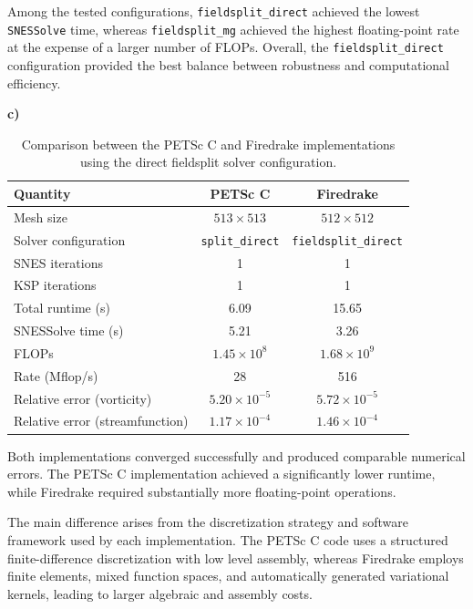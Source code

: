 \documentclass[12pt]{article}
\begin{document}
Among the tested configurations, \texttt{fieldsplit\_direct} achieved the lowest \texttt{SNESSolve} time, whereas \texttt{fieldsplit\_mg} achieved the highest floating-point rate at the expense of a larger number of FLOPs. 
Overall, the \texttt{fieldsplit\_direct} configuration provided the best balance between robustness and computational efficiency.


\textbf{c)}

\begin{table}[h!]
\centering
\small
\begin{tabular}{lcc}
\hline
\textbf{Quantity} & \textbf{PETSc C} & \textbf{Firedrake} \\
\hline
Mesh size & $513 \times 513$ & $512 \times 512$ \\

Solver configuration & \texttt{split\_direct} & \texttt{fieldsplit\_direct} \\

SNES iterations & 1 & 1 \\

KSP iterations & 1 & 1 \\

Total runtime (s) & 6.09 & 15.65 \\

SNESSolve time (s) & 5.21 & 3.26 \\

FLOPs & $1.45\times10^8$ & $1.68\times10^9$ \\

Rate (Mflop/s) & 28 & 516 \\

Relative error (vorticity) 
& $5.20\times10^{-5}$ 
& $5.72\times10^{-5}$ \\

Relative error (streamfunction) 
& $1.17\times10^{-4}$ 
& $1.46\times10^{-4}$ \\
\hline
\end{tabular}
\caption{Comparison between the PETSc C and Firedrake implementations using the direct fieldsplit solver configuration.}
\label{tab:c_vs_fd}
\end{table}

Both implementations converged successfully and produced comparable numerical errors. 
The PETSc C implementation achieved a significantly lower runtime, while Firedrake required substantially more floating-point operations.

The main difference arises from the discretization strategy and software framework used by each implementation. 
The PETSc C code uses a structured finite-difference discretization with low level assembly, whereas Firedrake employs finite elements, mixed function spaces, and automatically generated variational kernels, leading to larger algebraic and assembly costs.
\end{document}

